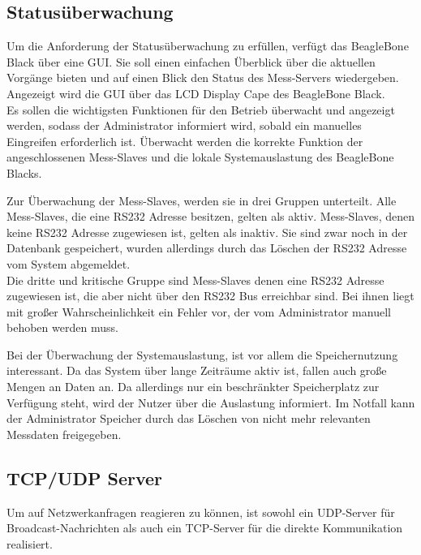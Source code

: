 

\subsection{Statusüberwachung}
\label{section_Statusüberwachung}
Um die Anforderung der Statusüberwachung zu erfüllen, verfügt das BeagleBone Black über eine \ac{GUI}. Sie soll einen einfachen Überblick über die aktuellen Vorgänge bieten und auf einen Blick den Status des Mess-Servers wiedergeben. Angezeigt wird die \ac{GUI} über das LCD Display Cape des BeagleBone Black.\\
Es sollen die wichtigsten Funktionen für den Betrieb überwacht und angezeigt werden, sodass der Administrator informiert wird, sobald ein manuelles Eingreifen erforderlich ist.
Überwacht werden die korrekte Funktion der angeschlossenen Mess-Slaves und die lokale Systemauslastung des BeagleBone Blacks.\ 

Zur Überwachung der Mess-Slaves, werden sie in drei Gruppen unterteilt. Alle Mess-Slaves, die eine RS232 Adresse besitzen, gelten als aktiv. Mess-Slaves, denen keine RS232 Adresse zugewiesen ist, gelten als inaktiv. Sie sind zwar noch in der Datenbank gespeichert, wurden allerdings durch das Löschen der RS232 Adresse vom System abgemeldet.\\
Die dritte und kritische Gruppe sind Mess-Slaves denen eine RS232 Adresse zugewiesen ist, die aber nicht über den RS232 Bus erreichbar sind. Bei ihnen liegt mit großer Wahrscheinlichkeit ein Fehler vor, der vom Administrator manuell behoben werden muss.\ 

Bei der Überwachung der Systemauslastung, ist vor allem die Speichernutzung interessant. Da das System über lange Zeiträume aktiv ist, fallen auch große Mengen an Daten an. Da allerdings nur ein beschränkter Speicherplatz zur Verfügung steht, wird der Nutzer über die Auslastung informiert. Im Notfall kann der Administrator Speicher durch das Löschen von nicht mehr relevanten Messdaten freigegeben.


\subsection{TCP/UDP Server}
\label{section_TCPUDPServer}
Um auf Netzwerkanfragen reagieren zu können, ist sowohl ein UDP-Server für Broadcast-Nachrichten als auch ein TCP-Server für die direkte Kommunikation realisiert.\ 

